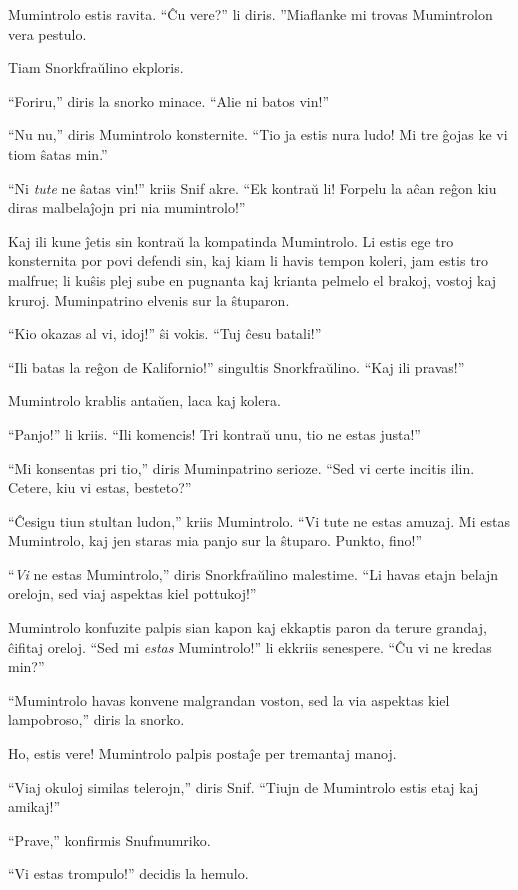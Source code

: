 Mumintrolo estis ravita. ``Ĉu vere?'' li diris. ''Miaflanke mi trovas Mumintrolon vera pestulo.

Tiam Snorkfraŭlino ekploris.

``Foriru,'' diris la snorko minace. ``Alie ni batos vin!''

``Nu nu,'' diris Mumintrolo konsternite. ``Tio ja estis nura ludo! Mi tre ĝojas ke vi tiom ŝatas min.''

``Ni \emph{tute} ne ŝatas vin!'' kriis Snif akre. ``Ek kontraŭ li! Forpelu la aĉan reĝon kiu diras malbelaĵojn pri nia mumintrolo!''

Kaj ili kune ĵetis sin kontraŭ la kompatinda Mumintrolo. Li estis ege tro konsternita por povi defendi sin, kaj kiam li havis tempon koleri, jam estis tro malfrue; li kuŝis plej sube en pugnanta kaj krianta pelmelo el brakoj, vostoj kaj kruroj. Muminpatrino elvenis sur la ŝtuparon.

``Kio okazas al vi, idoj!'' ŝi vokis. ``Tuj ĉesu batali!''

``Ili batas la reĝon de Kalifornio!'' singultis Snorkfraŭlino. ``Kaj ili pravas!''

Mumintrolo krablis antaŭen, laca kaj kolera.

``Panjo!'' li kriis. ``Ili komencis! Tri kontraŭ unu, tio ne estas justa!''

``Mi konsentas pri tio,'' diris Muminpatrino serioze. ``Sed vi certe incitis ilin. Cetere, kiu vi estas, besteto?''

``Ĉesigu tiun stultan ludon,'' kriis Mumintrolo. ``Vi tute ne estas amuzaj. Mi estas Mumintrolo, kaj jen staras mia panjo sur la ŝtuparo. Punkto, fino!''

``\emph{Vi} ne estas Mumintrolo,'' diris Snorkfraŭlino malestime. ``Li havas etajn belajn orelojn, sed viaj aspektas kiel pottukoj!''

Mumintrolo konfuzite palpis sian kapon kaj ekkaptis paron da terure grandaj, ĉifitaj oreloj. ``Sed mi \emph{estas} Mumintrolo!'' li ekkriis senespere. ``Ĉu vi ne kredas min?''

``Mumintrolo havas konvene malgrandan voston, sed la via aspektas kiel lampobroso,'' diris la snorko.

Ho, estis vere! Mumintrolo palpis postaĵe per tremantaj manoj.

``Viaj okuloj similas telerojn,'' diris Snif. ``Tiujn de Mumintrolo estis etaj kaj amikaj!''

``Prave,'' konfirmis Snufmumriko.

``Vi estas trompulo!'' decidis la hemulo.

